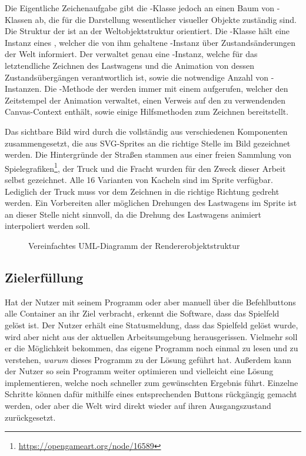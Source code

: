 Die Eigentliche Zeichenaufgabe gibt die -Klasse jedoch an einen Baum von -Klassen ab, die für die Darstellung wesentlicher visueller Objekte zuständig sind. Die Struktur der  ist an der Weltobjektstruktur orientiert. Die -Klasse hält eine Instanz eines , welcher die von ihm gehaltene -Instanz über Zustandsänderungen der Welt informiert. Der  verwaltet genau eine -Instanz, welche für das letztendliche Zeichnen des Lastwagens und die Animation von dessen Zustandsübergängen verantwortlich ist, sowie die notwendige Anzahl von -Instanzen. Die -Methode der  werden immer mit einem  aufgerufen, welcher den Zeitstempel der Animation verwaltet, einen Verweis auf den zu verwendenden Canvas-Context enthält, sowie einige Hilfsmethoden zum Zeichnen bereitstellt.

Das sichtbare Bild wird durch die  vollständig aus verschiedenen Komponenten zusammengesetzt, die aus SVG-Sprites an die richtige Stelle im Bild gezeichnet werden. Die Hintergründe der Straßen stammen aus einer freien Sammlung von Spielegrafiken\footnote{\url{https://opengameart.org/node/16589}}, der Truck und die Fracht wurden für den Zweck dieser Arbeit selbst gezeichnet. Alle 16 Varianten von Kacheln sind im Sprite verfügbar. Lediglich der Truck muss vor dem Zeichnen in die richtige Richtung gedreht werden. Ein Vorbereiten aller möglichen Drehungen des Lastwagens im Sprite ist an dieser Stelle nicht sinnvoll, da die Drehung des Lastwagens animiert interpoliert werden soll.

\begin{figure}
  
  \caption{Vereinfachtes UML-Diagramm der Rendererobjektstruktur}
  \label{sec:implementation:rendering:structure:uml}
\end{figure}

\subsection{Zielerfüllung}
\label{sec:implementation:program:finish}

Hat der Nutzer mit seinem Programm oder aber manuell über die Befehlbuttons alle Container an ihr Ziel verbracht, erkennt die Software, dass das Spielfeld gelöst ist. Der Nutzer erhält eine Statusmeldung, dass das Spielfeld gelöst wurde, wird aber nicht aus der aktuellen Arbeitsumgebung herausgerissen. Vielmehr soll er die Möglichkeit bekommen, das eigene Programm noch einmal zu lesen und zu verstehen, \emph{warum} dieses Programm zu der Lösung geführt hat. Außerdem kann der Nutzer so sein Programm weiter optimieren und vielleicht eine Lösung implementieren, welche noch schneller zum gewünschten Ergebnis führt. Einzelne Schritte können dafür mithilfe eines entsprechenden Buttons rückgängig gemacht werden, oder aber die Welt wird direkt wieder auf ihren Ausgangszustand zurückgesetzt.

